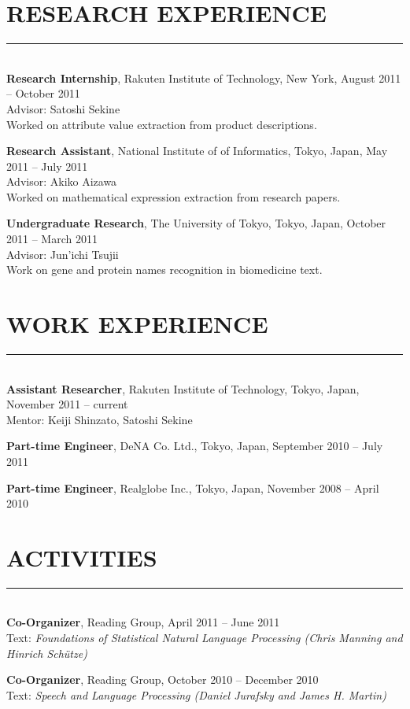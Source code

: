 \documentclass[12pt]{res}
\newcommand{\sectionline}[1][0.5pt]{\rule{\resumewidth}{#1}\\}
\begin{document}
\begin{resume}
\section{\uppercase{Research Experience}}
\sectionline
\textbf{Research Internship}, Rakuten Institute of Technology, New York, August 2011 -- October 2011\\
Advisor: Satoshi Sekine\\
Worked on attribute value extraction from product descriptions. 

\textbf{Research Assistant}, National Institute of of Informatics, Tokyo, Japan, May 2011 -- July 2011\\
Advisor: Akiko Aizawa\\
Worked on mathematical expression extraction from research papers.

\textbf{Undergraduate Research}, The University of Tokyo, Tokyo, Japan, October 2011 -- March 2011\\
Advisor: Jun'ichi Tsujii\\
Work on gene and protein names recognition in biomedicine text.\\

\section{\uppercase{Work Experience}}
\sectionline
\textbf{Assistant Researcher}, Rakuten Institute of Technology, Tokyo, Japan, November 2011 -- current\\
Mentor: Keiji Shinzato, Satoshi Sekine

\textbf{Part-time Engineer}, DeNA Co. Ltd., Tokyo, Japan, September 2010 -- July 2011

\textbf{Part-time Engineer}, Realglobe Inc., Tokyo, Japan, November 2008 -- April 2010\\

\section{\uppercase{Activities}}
\sectionline
\textbf{Co-Organizer}, Reading Group, April 2011 -- June 2011\\
Text: {\sl Foundations of Statistical Natural Language Processing (Chris Manning and Hinrich Sch\"{u}tze)}

\textbf{Co-Organizer},  Reading Group, October 2010 -- December 2010\\
Text: {\sl Speech and Language Processing (Daniel Jurafsky and James H. Martin)}\\


\end{resume}
\end{document}
